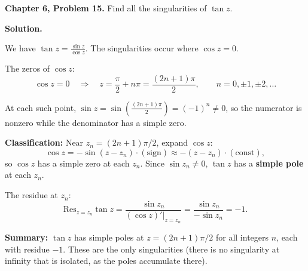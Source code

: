 \documentclass[12pt]{article}
\begin{document}
\textbf{Chapter 6, Problem 15.} Find all the singularities of $\tan z$.

\bigskip
\textbf{Solution.}

We have $\tan z = \frac{\sin z}{\cos z}$. The singularities occur where $\cos z = 0$.

The zeros of $\cos z$:
\[
\cos z = 0 \quad \Rightarrow \quad z = \frac{\pi}{2} + n\pi = \frac{(2n+1)\pi}{2}, \qquad n = 0, \pm 1, \pm 2, \ldots
\]

At each such point, $\sin z = \sin\left(\frac{(2n+1)\pi}{2}\right) = (-1)^n \neq 0$, so the numerator is nonzero while the denominator has a simple zero.

\textbf{Classification:} Near $z_n = (2n+1)\pi/2$, expand $\cos z$:
\[
\cos z = -\sin(z - z_n)\cdot(\text{sign}) \approx -(z-z_n)\cdot(\text{const}),
\]
so $\cos z$ has a simple zero at each $z_n$. Since $\sin z_n \neq 0$, $\tan z$ has a \textbf{simple pole} at each $z_n$.

The residue at $z_n$:
\[
\text{Res}_{z=z_n}\tan z = \frac{\sin z_n}{(\cos z)'|_{z=z_n}} = \frac{\sin z_n}{-\sin z_n} = -1.
\]

\textbf{Summary:} $\tan z$ has simple poles at $z = (2n+1)\pi/2$ for all integers $n$, each with residue $-1$. These are the only singularities (there is no singularity at infinity that is isolated, as the poles accumulate there).
\end{document}
